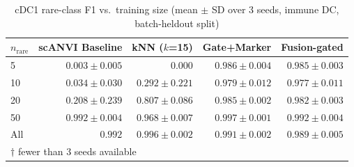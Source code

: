 \begin{table}[h]
\centering
\small
\caption{cDC1 rare-class F1 vs.\ training size (mean $\pm$ SD over 3 seeds, immune DC, batch-heldout split)}
\begin{tabular}{lrrrr}
\hline
$n_\text{rare}$ & scANVI Baseline & kNN ($k$=15) & \textbf{Gate+Marker} & \textbf{Fusion-gated} \\
\hline
5 & $0.003 \pm 0.005$ & $0.000$ & \textbf{$0.986 \pm 0.004$} & $0.985 \pm 0.003$ \\
10 & $0.034 \pm 0.030$ & $0.292 \pm 0.221$ & \textbf{$0.979 \pm 0.012$} & $0.977 \pm 0.011$ \\
20 & $0.208 \pm 0.239$ & $0.807 \pm 0.086$ & \textbf{$0.985 \pm 0.002$} & $0.982 \pm 0.003$ \\
50 & $0.992 \pm 0.004$ & $0.968 \pm 0.007$ & \textbf{$0.997 \pm 0.001$} & $0.992 \pm 0.004$ \\
All & $0.992$ & \textbf{$0.996 \pm 0.002$} & $0.991 \pm 0.002$ & $0.989 \pm 0.005$ \\
\hline
\multicolumn{5}{l}{$\dagger$ fewer than 3 seeds available} \\
\end{tabular}
\label{tab:cdc1_ablation}
\end{table}
